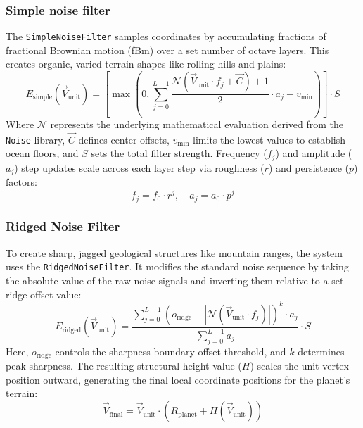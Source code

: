 \documentclass[12pt]{report}
\begin{document}
\subsubsection{Simple noise filter}
The \texttt{SimpleNoiseFilter} samples coordinates by accumulating fractions of fractional Brownian motion (fBm) over a set number of octave layers. This creates organic, varied terrain shapes like rolling hills and plains:
\begin{equation}
E_{\text{simple}}(\vec{V}_{\text{unit}}) = \left[ \max\left(0, \sum_{j=0}^{L-1} \frac{\mathcal{N}(\vec{V}_{\text{unit}} \cdot f_j + \vec{C}) + 1}{2} \cdot a_j - v_{\text{min}}\right) \right] \cdot S
\end{equation}
Where $\mathcal{N}$ represents the underlying mathematical evaluation derived from the \texttt{Noise} library, $\vec{C}$ defines center offsets, $v_{\text{min}}$ limits the lowest values to establish ocean floors, and $S$ sets the total filter strength. Frequency ($f_j$) and amplitude ($a_j$) step updates scale across each layer step via roughness ($r$) and persistence ($p$) factors:
\begin{equation}
f_j = f_0 \cdot r^j, \quad a_j = a_0 \cdot p^j
\end{equation}

\subsubsection{Ridged Noise Filter}
To create sharp, jagged geological structures like mountain ranges, the system uses the \texttt{RidgedNoiseFilter}. It modifies the standard noise sequence by taking the absolute value of the raw noise signals and inverting them relative to a set ridge offset value:
\begin{equation}
E_{\text{ridged}}(\vec{V}_{\text{unit}}) = \frac{\sum_{j=0}^{L-1} \left( o_{\text{ridge}} - |\mathcal{N}(\vec{V}_{\text{unit}} \cdot f_j)| \right)^{k} \cdot a_j}{\sum_{j=0}^{L-1} a_j} \cdot S
\end{equation}
Here, $o_{\text{ridge}}$ controls the sharpness boundary offset threshold, and $k$ determines peak sharpness. The resulting structural height value ($H$) scales the unit vertex position outward, generating the final local coordinate positions for the planet's terrain:
\begin{equation}
\vec{V}_{\text{final}} = \vec{V}_{\text{unit}} \cdot \left( R_{\text{planet}} + H(\vec{V}_{\text{unit}}) \right)
\end{equation}
\end{document}
